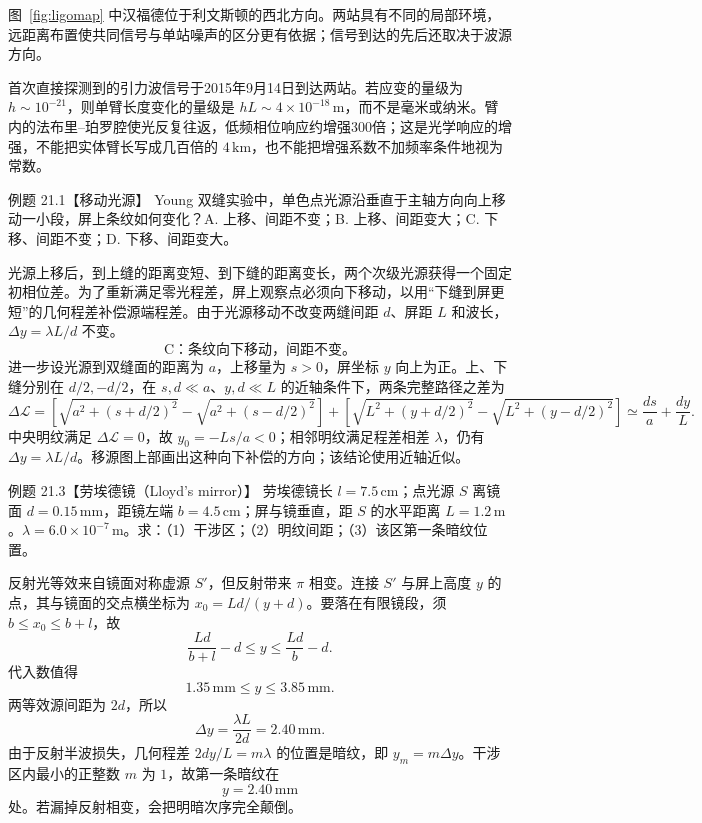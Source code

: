图~\ref{fig:ligomap} 中汉福德位于利文斯顿的西北方向。两站具有不同的局部环境，远距离布置使共同信号与单站噪声的区分更有依据；信号到达的先后还取决于波源方向。

首次直接探测到的引力波信号于2015年9月14日到达两站。若应变的量级为 $h\sim10^{-21}$，则单臂长度变化的量级是 $hL\sim4\times10^{-18}\,\mathrm m$，而不是毫米或纳米。臂内的法布里--珀罗腔使光反复往返，低频相位响应约增强300倍；这是光学响应的增强，不能把实体臂长写成几百倍的 $4\,\mathrm{km}$，也不能把增强系数不加频率条件地视为常数。

\MovingLloydPanel

\begin{origexamplebox}{例题 21.1【移动光源】}
Young 双缝实验中，单色点光源沿垂直于主轴方向向上移动一小段，屏上条纹如何变化？A. 上移、间距不变；B. 上移、间距变大；C. 下移、间距不变；D. 下移、间距变大。
\end{origexamplebox}
\begin{xesolution}
光源上移后，到上缝的距离变短、到下缝的距离变长，两个次级光源获得一个固定初相位差。为了重新满足零光程差，屏上观察点必须向下移动，以用“下缝到屏更短”的几何程差补偿源端程差。由于光源移动不改变两缝间距 $d$、屏距 $L$ 和波长，$\Delta y=\lambda L/d$ 不变。
\[
 \boxed{\text{C：条纹向下移动，间距不变。}}
\]
进一步设光源到双缝面的距离为 $a$，上移量为 $s>0$，屏坐标 $y$ 向上为正。上、下缝分别在 $d/2,-d/2$，在 $s,d\ll a$、$y,d\ll L$ 的近轴条件下，两条完整路径之差为
\[
 \Delta\mathcal L=
 \left[\sqrt{a^2+(s+d/2)^2}-\sqrt{a^2+(s-d/2)^2}\right]
 +\left[\sqrt{L^2+(y+d/2)^2}-\sqrt{L^2+(y-d/2)^2}\right]
 \simeq\frac{ds}{a}+\frac{dy}{L}.
\]
中央明纹满足 $\Delta\mathcal L=0$，故 $y_0=-Ls/a<0$；相邻明纹满足程差相差 $\lambda$，仍有 $\Delta y=\lambda L/d$。移源图上部画出这种向下补偿的方向；该结论使用近轴近似。
\end{xesolution}

\begin{origexamplebox}{例题 21.3【劳埃德镜（Lloyd's mirror）】}
劳埃德镜长 $l=7.5\,\mathrm{cm}$；点光源 $S$ 离镜面 $d=0.15\,\mathrm{mm}$，距镜左端 $b=4.5\,\mathrm{cm}$；屏与镜垂直，距 $S$ 的水平距离 $L=1.2\,\mathrm m$。$\lambda=6.0\times10^{-7}\,\mathrm m$。求：（1）干涉区；（2）明纹间距；（3）该区第一条暗纹位置。
\end{origexamplebox}
\begin{xesolution}
反射光等效来自镜面对称虚源 $S'$，但反射带来 $\pi$ 相变。连接 $S'$ 与屏上高度 $y$ 的点，其与镜面的交点横坐标为 $x_0=Ld/(y+d)$。要落在有限镜段，须 $b\le x_0\le b+l$，故
\[
 \frac{Ld}{b+l}-d\le y\le\frac{Ld}{b}-d.
\]
代入数值得
\[
 \boxed{1.35\,\mathrm{mm}\le y\le3.85\,\mathrm{mm}}.
\]
两等效源间距为 $2d$，所以
\[
 \boxed{\Delta y=\frac{\lambda L}{2d}=2.40\,\mathrm{mm}}.
\]
由于反射半波损失，几何程差 $2dy/L=m\lambda$ 的位置是暗纹，即 $y_m=m\Delta y$。干涉区内最小的正整数 $m$ 为 $1$，故第一条暗纹在
\[
 \boxed{y=2.40\,\mathrm{mm}}
\]
处。若漏掉反射相变，会把明暗次序完全颠倒。
\end{xesolution}

